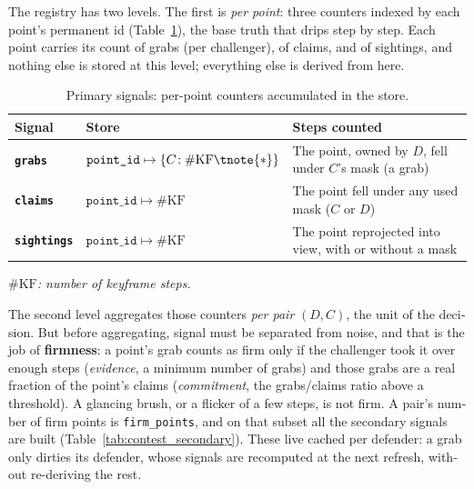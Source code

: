 \begin{otherlanguage}{english}
The registry has two levels. The first is \emph{per point}: three counters indexed by each point's
permanent id (Table~\ref{tab:contest_primary}), the base truth that drips step by step. Each point
carries its count of grabs (per challenger), of claims, and of sightings, and nothing else is stored
at this level; everything else is derived from here.

\begin{table}[ht]
  \centering
  \small
  \begin{threeparttable}
  \renewcommand{\arraystretch}{1.5}
  \begin{tabular}{@{}l l p{7.4cm}@{}}
    \toprule
    \textbf{Signal} & \textbf{Store} & \textbf{Steps counted} \\
    \midrule
    \textbf{\texttt{grabs}}     & $\texttt{point\_id}\mapsto\{C\!:\#\mathrm{KF}\tnote{*}\}$ &
      The point, owned by $D$, fell under $C$'s mask (a grab) \\
    \textbf{\texttt{claims}}    & $\texttt{point\_id}\mapsto\#\mathrm{KF}$ &
      The point fell under any used mask ($C$ or $D$) \\
    \textbf{\texttt{sightings}} & $\texttt{point\_id}\mapsto\#\mathrm{KF}$ &
      The point reprojected into view, with or without a mask \\
    \bottomrule
  \end{tabular}
  \begin{tablenotes}
    \footnotesize\item[*]\itshape $\#\mathrm{KF}$: number of
      keyframe steps.
  \end{tablenotes}
  \end{threeparttable}
  \caption{Primary signals: per-point counters accumulated in the store.}
  \label{tab:contest_primary}
\end{table}

The second level aggregates those counters \emph{per pair} $(D, C)$, the unit of the decision. But
before aggregating, signal must be separated from noise, and that is the job of \textbf{firmness}: a
point's grab counts as firm only if the challenger took it over enough steps (\emph{evidence}, a
minimum number of grabs) and those grabs are a real fraction of the point's claims
(\emph{commitment}, the grabs/claims ratio above a threshold). A glancing brush, or a flicker of a
few steps, is not firm. A pair's number of firm points is \texttt{firm\_points}, and on that subset
all the secondary signals are built (Table~\ref{tab:contest_secondary}). These live cached per
defender: a grab only dirties its defender, whose signals are recomputed at the next refresh, without
re-deriving the rest.


\end{otherlanguage}
